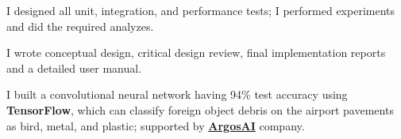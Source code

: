 \documentclass[letterpaper]{deedy-resume} %
\begin{document}
\begin{minipage}[t]{0.66\textwidth}
\begin{tightitemize}
\item I designed all unit, integration, and performance tests; I performed experiments and did the required analyzes.

\item I wrote conceptual design, critical design review, final implementation reports and a detailed user manual.

\end{tightitemize}

\sectionspace %



\begin{tightitemize}
\item I built a convolutional neural network having 94\% test accuracy using \textbf{TensorFlow}, which can classify foreign object debris on the airport pavements as bird, metal, and plastic; supported by \href{https://www.argosai.com/}{\bf ArgosAI} company. 
\end{tightitemize}

\sectionspace %


\sectionspace %


\end{minipage} %

\end{document}
